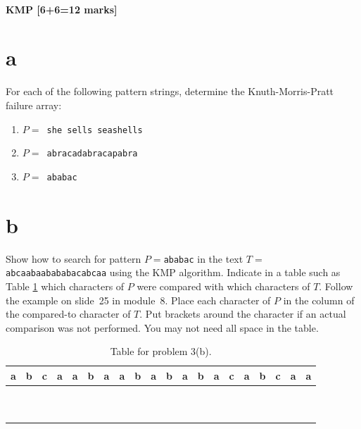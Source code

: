\documentclass[12pt]{article}
\begin{document}
\subsection{KMP [6+6=12 marks]}
\begin{itemize}
\part{a} For each of the following pattern strings, determine the Knuth-Morris-Pratt
failure array:
\begin{enumerate}
\item $P = ${\tt~she sells seashells}
\item $P = ${\tt~abracadabracapabra}
\item $P = ${\tt~ababac}
\end{enumerate}
\part{b}
Show how to search for pattern $P=$\texttt{ababac} in the text $T=$\texttt{abcaabaabababacabcaa} using the KMP algorithm. Indicate in a table such as Table \ref{kmp} which characters of $P$ were compared with which characters of $T$. Follow the example on slide~25 in module~8. Place each character of $P$ in the column of the compared-to character of $T$.  Put brackets around the character if an actual comparison was not performed. You may not need all space in the table.
\end{itemize}

\begin{table}[!ht]
\Large{
\begin{center}
\begin{tabular}{|c|c|c|c|c|c|c|c|c|c|c|c|c|c|c|c|c|c|c|c|}
\hline
a&b&c&a&a&b&a&a&b&a&b&a&b&a&c&a&b&c&a&a\\
\hline
\hline
&&&&&&&&&&&&&&&&&&&\\
\hline
&&&&&&&&&&&&&&&&&&&\\
\hline
&&&&&&&&&&&&&&&&&&&\\
\hline
&&&&&&&&&&&&&&&&&&&\\
\hline
&&&&&&&&&&&&&&&&&&&\\
\hline
&&&&&&&&&&&&&&&&&&&\\
\hline
&&&&&&&&&&&&&&&&&&&\\
\hline
&&&&&&&&&&&&&&&&&&&\\
\hline
&&&&&&&&&&&&&&&&&&&\\
\hline
&&&&&&&&&&&&&&&&&&&\\
\hline
\end{tabular}
\end{center}}
\caption{Table for problem 3(b).}\label{kmp}
\end{table}
\end{document}
